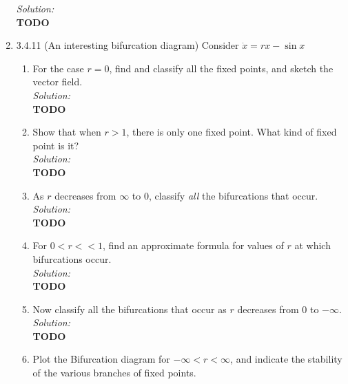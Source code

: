 \documentclass[10pt]{amsart}
\theoremstyle{nonumberplain}
\begin{document}
\begin{enumerate}[label={\bf {\arabic*}:}]
\noindent
\textit{Solution:} \\
\textbf{TODO} \\

\item 3.4.11 (An interesting bifurcation diagram) Consider $\dot x = rx - \sin x$ \\
\begin{enumerate}

\item For the case $r = 0$, find and classify all the fixed points, and sketch the vector field. \\

\noindent
\textit{Solution:} \\
\textbf{TODO} \\

\item Show that when $r > 1$, there is only one fixed point.
What kind of fixed point is it? \\

\noindent
\textit{Solution:} \\
\textbf{TODO} \\

\item As $r$ decreases from $\infty$ to $0$, classify \textit{all} the bifurcations that occur. \\

\noindent
\textit{Solution:} \\
\textbf{TODO} \\

\item For $0 < r << 1$, find an approximate formula for values of $r$ at which bifurcations occur. \\

\noindent
\textit{Solution:} \\
\textbf{TODO} \\

\item Now classify all the bifurcations that occur as $r$ decreases from 0 to $-\infty$. \\

\noindent
\textit{Solution:} \\
\textbf{TODO} \\

\item Plot the Bifurcation diagram for $-\infty < r < \infty$, and indicate the stability of the various branches of fixed points. \\


\end{enumerate}
\end{enumerate}
\end{document}
